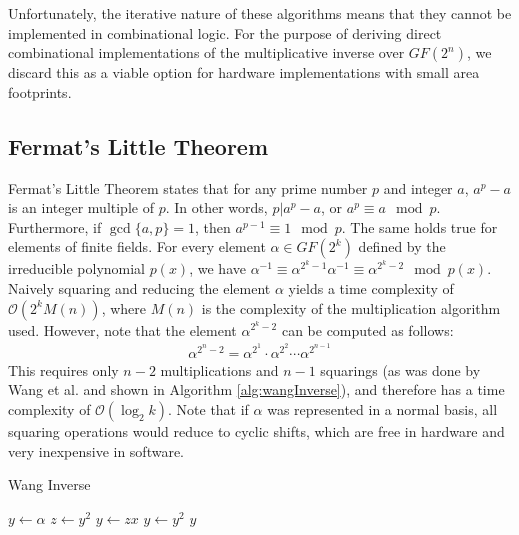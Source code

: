 Unfortunately, the iterative nature of these algorithms means that they cannot be implemented
in combinational logic. For the purpose of deriving direct combinational implementations of the 
multiplicative inverse over $GF(2^n)$, we discard this as a viable option for hardware implementations
with small area footprints. 

\subsection{Fermat's Little Theorem}
Fermat's Little Theorem states that for any prime number $p$ and integer $a$, $a^p - a$ is
an integer multiple of $p$. In other words, $p | a^p -a$, or $a^p \equiv a \mod p$. Furthermore,
if $\gcd\{a,p\}=1$, then $a^{p-1} \equiv 1 \mod p$. The same holds true for elements of finite fields.
For every element $\alpha \in GF(2^k)$ defined by the irreducible polynomial $p(x)$, we 
have $\alpha^{-1} \equiv \alpha^{2^k - 1}\alpha^{-1} \equiv \alpha^{2^k - 2} \mod p(x)$.
Naively squaring and reducing the element $\alpha$ yields a time complexity of $\mathcal{O}(2^kM(n))$, 
where $M(n)$ is the complexity of the multiplication algorithm used. However, 
note that the element $\alpha^{2^k - 2}$ can be computed as follows:
\begin{align*}
\alpha^{2^{n} - 2} = \alpha^{2^{1}} \cdot \alpha^{2^{2}} \dotsb \alpha^{2^{n-1}}
\end{align*}
This requires only $n - 2$ multiplications and $n - 1$ squarings
(as was done by Wang et al. \cite{Wang85-1} and shown in Algorithm \ref{alg:wangInverse}), and therefore
has a time complexity of $\mathcal{O}(\log_2 k)$. Note that if $\alpha$ was 
represented in a normal basis, all squaring operations would reduce to cyclic 
shifts, which are free in hardware and very inexpensive in software.
\begin{algorithm}[t] %
\caption{Wang Inverse} \label{alg:wangInverse}
\begin{algorithmic}[1]
	\State $y \gets \alpha$
		\State $z \gets y^2$
		\State $y \gets zx$ %
	\EndFor
	\State $y \gets y^2$
	\State \Return $y$
\end{algorithmic}
\end{algorithm}
